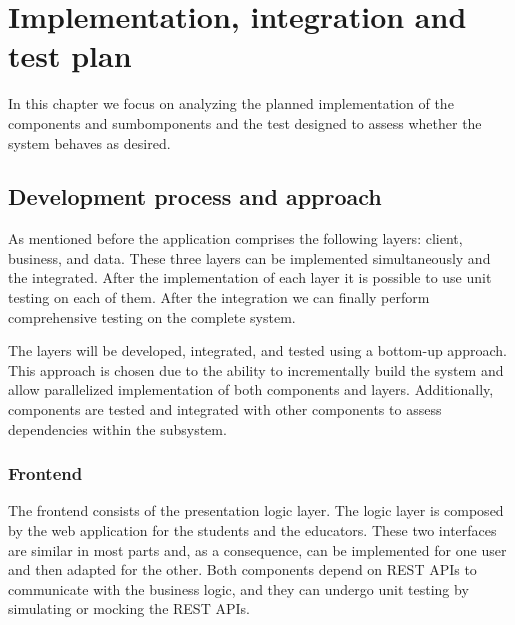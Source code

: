 \documentclass[12pt, a4paper]{report}
\begin{document}
\chapter{Implementation, integration and test plan}
    In this chapter we focus on analyzing the planned implementation of the components and sumbomponents and the test designed to assess whether the system behaves as desired.

    \section{Development process and approach}
    As mentioned before the application comprises the following layers: client, business, and data. 
    These three layers can be implemented simultaneously and the integrated. 
    After the implementation of each layer it is possible to use unit testing on each of them. 
    After the integration we can finally perform comprehensive testing on the complete system. 

    The layers will be developed, integrated, and tested using a bottom-up approach. 
    This approach is chosen due to the ability to incrementally build the system and allow parallelized implementation of both components and layers. 
    Additionally, components are tested and integrated with other components to assess dependencies within the subsystem.

    \subsection{Frontend}
    The frontend consists of the presentation logic layer. 
    The logic layer is composed by the web application for the students and the educators. 
    These two interfaces are similar in most parts and, as a consequence, can be implemented for one user and then adapted for the other. 
    Both components depend on REST APIs to communicate with the business logic, and they can undergo unit testing by simulating or mocking the REST APIs.
\end{document}
